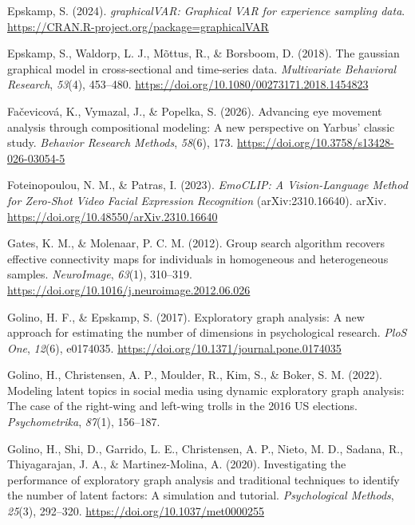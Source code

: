 \documentclass[
]{article}
\newlength{\cslhangindent}
\newenvironment{CSLReferences}[2] %
 {\begin{list}{}{%
  \setlength{\itemindent}{0pt}
  \setlength{\leftmargin}{0pt}
  \setlength{\parsep}{0pt}
  \ifodd #1
   \setlength{\leftmargin}{\cslhangindent}
   \setlength{\itemindent}{-1\cslhangindent}
  \fi
  \setlength{\itemsep}{#2\baselineskip}}}
 {\end{list}}
\begin{document}
\begin{CSLReferences}{1}{0}
Epskamp, S. (2024). \emph{graphicalVAR: Graphical VAR for experience
sampling data}. \url{https://CRAN.R-project.org/package=graphicalVAR}

Epskamp, S., Waldorp, L. J., Mõttus, R., \& Borsboom, D. (2018). The
gaussian graphical model in cross-sectional and time-series data.
\emph{Multivariate Behavioral Research}, \emph{53}(4), 453--480.
\url{https://doi.org/10.1080/00273171.2018.1454823}

Fačevicová, K., Vymazal, J., \& Popelka, S. (2026). Advancing eye
movement analysis through compositional modeling: A new perspective on
{Yarbus'} classic study. \emph{Behavior Research Methods}, \emph{58}(6),
173. \url{https://doi.org/10.3758/s13428-026-03054-5}

Foteinopoulou, N. M., \& Patras, I. (2023). \emph{{EmoCLIP}: {A
Vision-Language Method} for {Zero-Shot Video Facial Expression
Recognition}} (arXiv:2310.16640). {arXiv}.
\url{https://doi.org/10.48550/arXiv.2310.16640}

Gates, K. M., \& Molenaar, P. C. M. (2012). Group search algorithm
recovers effective connectivity maps for individuals in homogeneous and
heterogeneous samples. \emph{NeuroImage}, \emph{63}(1), 310--319.
\url{https://doi.org/10.1016/j.neuroimage.2012.06.026}

Golino, H. F., \& Epskamp, S. (2017). Exploratory graph analysis: A new
approach for estimating the number of dimensions in psychological
research. \emph{PloS One}, \emph{12}(6), e0174035.
\url{https://doi.org/10.1371/journal.pone.0174035}

Golino, H., Christensen, A. P., Moulder, R., Kim, S., \& Boker, S. M.
(2022). Modeling latent topics in social media using dynamic exploratory
graph analysis: The case of the right-wing and left-wing trolls in the
2016 US elections. \emph{Psychometrika}, \emph{87}(1), 156--187.

Golino, H., Shi, D., Garrido, L. E., Christensen, A. P., Nieto, M. D.,
Sadana, R., Thiyagarajan, J. A., \& Martinez-Molina, A. (2020).
Investigating the performance of exploratory graph analysis and
traditional techniques to identify the number of latent factors: A
simulation and tutorial. \emph{Psychological Methods}, \emph{25}(3),
292--320. \url{https://doi.org/10.1037/met0000255}


\end{CSLReferences}
\end{document}
